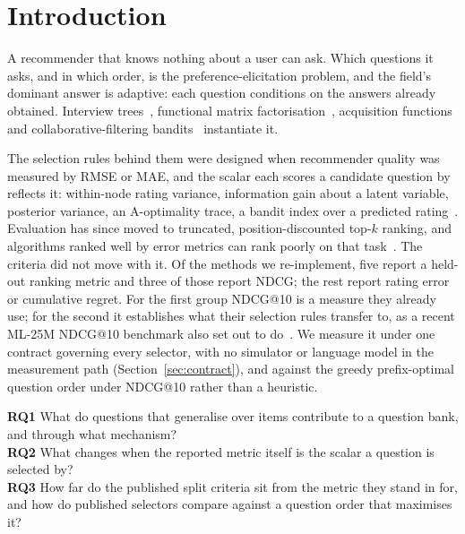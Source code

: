 \documentclass[runningheads]{llncs}
\begin{document}
\section{Introduction}
\label{sec:intro}

A recommender that knows nothing about a user can ask. Which questions it asks, and in which order,
is the preference-elicitation problem, and the field's dominant answer is adaptive: each question
conditions on the answers already obtained. Interview
trees~\cite{golbandi2011adaptive,hu2013interview}, functional matrix
factorisation~\cite{zhou2011functional}, acquisition
functions~\cite{ma2019eddi,houlsby2011bald} and collaborative-filtering
bandits~\cite{zhao2013interactive,zhang2020conucb,wang2023conlinucb,liu2025clisk} instantiate it.

The selection rules behind them were designed when recommender quality was measured by RMSE or MAE,
and the scalar each scores a candidate question by reflects
it: within-node rating variance, information gain about a latent variable, posterior variance, an
A-optimality trace, a bandit index over a predicted
rating~\cite{golbandi2011adaptive,ma2019eddi,houlsby2011bald,anava2015budget,sepliarskaia2018spq,zhao2013interactive,zhang2020conucb}. Evaluation has since moved to truncated, position-discounted top-$k$ ranking, and algorithms ranked
well by error metrics can rank poorly on that
task~\cite{cremonesi2010performance,dacrema2019progress,krichene2020sampled}. The
criteria did not move with it. Of the methods we re-implement, five report a held-out ranking metric
and three of those report NDCG; the rest report rating error or cumulative regret. For the first
group NDCG@10 is a measure they already use; for the second it establishes what their selection rules
transfer to, as a recent ML-25M NDCG@10 benchmark also set out to
do~\cite{proissl2024greedyslim}. We measure it under one contract governing every selector, with no simulator or language model in
the measurement path (Section~\ref{sec:contract}), and against the greedy prefix-optimal
question order under NDCG@10 rather than a heuristic.

\medskip
\noindent
\textbf{RQ1} What do questions that generalise over items contribute to a question bank, and
through what mechanism?\\
\textbf{RQ2} What changes when the reported metric itself is the scalar a question is selected by?\\
\textbf{RQ3} How far do the published split criteria sit from the metric they stand in for, and how
do published selectors compare against a question order that maximises it?
\medskip
\end{document}
